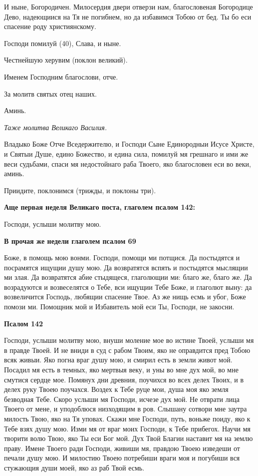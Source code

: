 И ныне, Богородичен. Милосердия двери отверзи нам, благословеная Богородице Дево, надеющиися на Тя не погибнем, но да избавимся Тобою от бед. Ты бо еси спасение роду християнскому.


Господи помилуй (40), Слава, и ныне.


Честнейшую херувим (поклон великий).


Именем Господним благослови, отче.


За молитв святых отец наших.


Аминь.


\itshape Таже молитва Великаго Василия.\normalfont{}


Владыко Боже Отче Вседержителю, и Господи Сыне Единородныи Исусе Христе, и Святыи Душе, едино Божество, и едина сила, помилуй мя грешнаго и ими же веси судьбами, спаси мя недостойнаго раба Твоего, яко благословен еси во веки, аминь.


Приидите, поклонимся (трижды, и поклоны три).







\bfseries Аще первая неделя Великаго поста, глаголем псалом 142:\normalfont{}


Господи, услыши молитву мою.







\bfseries В прочая же недели глаголем псалом 69\normalfont{}


Боже, в помощь мою вонми. Господи, помощи ми потщися. Да постыдятся и посрамятся ищущии душу мою. Да возвратятся вспять и постыдятся мыслящии ми злая. Да возвратятся абие стыдящеся, глаголющии ми: благо же, благо же. Да возрадуются и возвеселятся о Тебе, вси ищущии Тебе Боже, и глаголют выну: да возвеличится Господь, любящии спасение Твое. Аз же нищь есмь и убог, Боже помози ми. Помощник мой и Избавитель мой еси Ты, Господи, не закосни.







\bfseries Псалом 142\normalfont{}


Господи, услыши молитву мою, внуши моление мое во истине Твоей, услыши мя в правде Твоей. И не вниди в суд с рабом Твоим, яко не оправдится пред Тобою всяк живыи. Яко погна враг душу мою, и смирил есть в земли живот мой. Посадил мя есть в темных, яко мертвыя веку, и уны во мне дух мой, во мне смутися сердце мое. Помянух дни древния, поучихся во всех делех Твоих, и в делех руку Твоею поучахся. Воздех к Тебе руце мои, душа моя яко земля безводная Тебе. Скоро услыши мя Господи, исчезе дух мой. Не отврати лица Твоего от мене, и уподоблюся низходящим в ров. Слышану сотвори мне заутра милость Твою, яко на Тя уповах. Скажи мне Господи, путь, воньже поиду, яко к Тебе взях душу мою. Изми мя от враг моих Господи, к Тебе прибегох. Научи мя творити волю Твою, яко Ты еси Бог мой. Дух Твой Благии наставит мя на землю праву. Имене Твоего ради Господи, живиши мя, правдою Твоею изведеши от печали душу мою. И милостию Твоею потребиши враги моя и погубиши вся стужающия души моей, яко аз раб Твой есмь.



